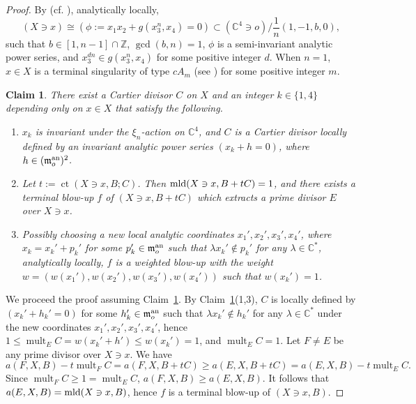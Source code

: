\documentclass[11pt]{amsart}
\numberwithin{equation}{section}
\newcommand{\Cc}{\mathbb{C}}
\newcommand{\Zz}{\mathbb{Z}}
\newcommand{\mld}{{\rm{mld}}}
\newcommand{\ct}{\operatorname{ct}}
\newcommand{\mult}{\operatorname{mult}}
\newtheorem{claim}[thm]{Claim}
\theoremstyle{definition}
\theoremstyle{definition}
\begin{document}
\begin{proof}
By \cite[(6.1) Theorem]{Rei87} (cf. \cite[Theorems 12,23,25]{Mor85}), analytically locally, $$(X\ni x)\cong (\phi:= x_1x_2+g(x_3^n,x_4)=0)\subset (\mathbb C^4\ni o)/\frac{1}{n}(1,-1,b,0),$$ such that $b\in [1,n-1]\cap \Zz$, $\gcd(b,n)=1$, $\phi$ is a semi-invariant analytic power series, and $x_3^{dn}\in g(x_3^n,x_4)$ for some positive integer $d$. When $n=1$, $x\in X$ is a terminal singularity of type $cA_m$ (see \cite[Page 333, Line 11]{Kaw03}) for some positive integer $m$. 

\begin{claim}\label{claim: choosing a Cartier divisor C with mult 1}
There exist a Cartier divisor $C$ on $X$ and an integer $k\in \{1,4\}$ depending only on $x\in X$ that satisfy the following.
\begin{enumerate}
    \item $x_k$ is invariant under the $\xi_n$-action on $\Cc^4$, and $C$ is a Cartier divisor locally defined by an invariant analytic power series $(x_k+h=0)$, where $h\in (\mathfrak{m}_o^{\rm an})^2$.
    \item Let $t:=\ct(X\ni x,B;C)$. Then $\mld(X\ni x, B+tC)=1$, and there exists a terminal blow-up $f$ of $(X\ni x, B+tC)$ which extracts a prime divisor $E$ over $X\ni x$.
    \item Possibly choosing a new local analytic coordinates $x_1',x_2',x_3',x_4'$, where $x_k=x_k'+p_k'$ for some $p_k'\in \mathfrak{m}_o^{\rm an}$ such that $\lambda x_k'\notin p_k'$ for any $\lambda\in \Cc^*$, analytically locally, $f$ is a weighted blow-up with the weight $w=(w(x_1'),w(x_2'),w(x_3'),w(x_4'))$ such that $w(x_k')=1$.
\end{enumerate}
\end{claim}

We proceed the proof assuming Claim~\ref{claim: choosing a Cartier divisor C with mult 1}. By Claim~\ref{claim: choosing a Cartier divisor C with mult 1}(1,3), $C$ is locally defined by $(x_k'+h_k'=0)$ for some $h_k'\in \mathfrak{m}_o^{\rm an}$ such that $\lambda x_k'\notin h_k'$ for any $\lambda\in \Cc^*$ under the new coordinates $x_1', x_2', x_3', x_4'$, hence $1\leq \mult_E C=w(x_k'+h')\leq w(x_k')=1$, and $\mult_E C=1$. Let $F\neq E$ be any prime divisor over $X\ni x$. We have $$a(F,X,B)-t\mult_F C=a(F,X,B+tC)\geq a(E,X,B+tC)=a(E,X,B)-t\mult_E C.$$ Since $\mult_F C\geq 1=\mult_E C$, $a(F,X,B)\geq a(E,X,B)$. It follows that $a(E,X,B)=\mld(X\ni x, B)$, hence $f$ is a terminal blow-up of $(X\ni x, B)$.
\end{proof}
\end{document}
